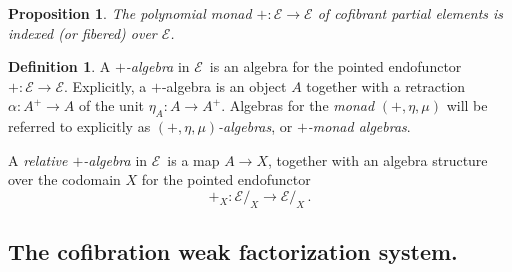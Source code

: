 \documentclass[11pt,reqno]{amsart}
\newcommand{\EE}{\ensuremath{\mathcal{E}}}
\newcommand{\slice}[1]{\ensuremath{/_{\!{#1}}}}
\newcommand{\ra}{\ensuremath{\rightarrow}}
\newcommand{\too}{\ensuremath{\longrightarrow}}
\newtheorem{proposition}[theorem]{Proposition}
\theoremstyle{remark}
\theoremstyle{definition}
\newtheorem{definition}[theorem]{Definition}
\begin{document}
\begin{proposition}\label{prop:fiberedpolymonad}
The polynomial monad $+ : \EE \ra \EE$ of \emph{cofibrant partial elements} is indexed (or fibered) over \EE.
\end{proposition}

\begin{definition}\label{def:+alg}
A \emph{$+$-algebra} in \EE\ is an algebra for the pointed endofunctor $+ : \EE\ra \EE$.  Explicitly, a $+$-algebra is an object $A$ together with a retraction $\alpha : A^+\ra A$ of the unit $\eta_A : A \ra A^+$.  Algebras for the \emph{monad} $(+, \eta, \mu)$ will be referred to explicitly as \emph{$(+, \eta, \mu)$-algebras}, or \emph{$+$-monad algebras}. 

A \emph{relative $+$-algebra} in \EE\ is a map $A \ra X$, together with an algebra structure over the codomain $X$ for the pointed endofunctor 
\[
+_X : \EE\slice{X} \too \EE\slice{X}\,.
\]
\end{definition}

\subsection*{The cofibration weak factorization system.}
\end{document}
